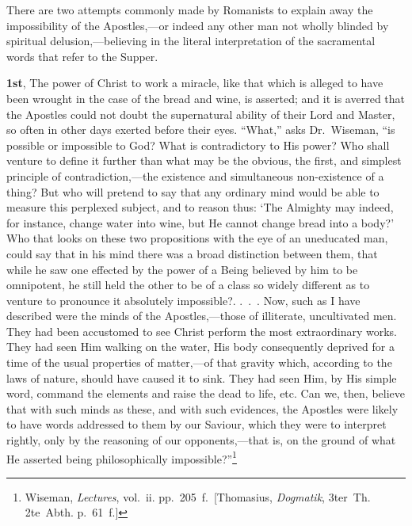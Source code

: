 \documentclass[
  english,
]{book}
\begin{document}
There are two attempts commonly made by Romanists to explain away the impossibility of the Apostles,---or indeed any other man not wholly blinded by spiritual delusion,---believing in the literal interpretation of the sacramental words that refer to the Supper.

\textbf{1st}, The power of Christ to work a miracle, like that which is alleged to have been wrought in the case of the bread and wine, is asserted; and it is averred that the Apostles could not doubt the supernatural ability of their Lord and Master, so often in other days exerted before their eyes. ``What,'' asks Dr.~Wiseman, ``is possible or impossible to God? What is contradictory to His power? Who shall venture to define it further than what may be the obvious, the first, and simplest principle of contradiction,---the existence and simultaneous non-existence of a thing? But who will pretend to say that any ordinary mind would be able to measure this perplexed subject, and to reason thus: `The Almighty may indeed, for instance, change water into wine, but He cannot change bread into a body?' Who that looks on these two propositions with the eye of an uneducated man, could say that in his mind there was a broad distinction between them, that while he saw one effected by the power of a Being believed by him to be omnipotent, he still held the other to be of a class so widely different as to venture to pronounce it absolutely impossible?. .~.~. Now, such as I have described were the minds of the Apostles,---those of illiterate, uncultivated men. They had been accustomed to see Christ perform the most extraordinary works. They had seen Him walking on the water, His body consequently deprived for a time of the usual properties of matter,---of that gravity which, according to the laws of nature, should have caused it to sink. They had seen Him, by His simple word, command the elements and raise the dead to life, etc. Can we, then, believe that with such minds as these, and with such evidences, the Apostles were likely to have words addressed to them by our Saviour, which they were to interpret rightly, only by the reasoning of our opponents,---that is, on the ground of what He asserted being philosophically impossible?''\footnote{Wiseman, \emph{Lectures}, vol.~ii. pp.~205~f.~{[}Thomasius, \emph{Dogmatik}, 3ter~Th. 2te~Abth. p.~61~f.{]}}
\end{document}
